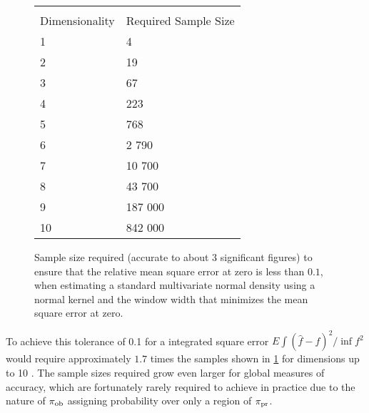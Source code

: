 \begin{figure}
  \begin{tabular}{ l | l }
  \hline \\ Dimensionality & Required Sample Size\\ \hline
  1  & 4\\
  2  & 19\\
  3  & 67\\
  4  & 223\\
  5  & 768\\
  6  & 2 790\\
  7  & 10 700\\
  8  & 43 700\\
  9  & 187 000\\
  10 & 842 000\\ \hline
  \end{tabular}
\caption{Sample size required (accurate to about 3 significant figures) to ensure that the relative mean square error at zero is less than $0.1$, when estimating a standard multivariate normal density using a normal kernel and the window width that minimizes the mean square error at zero.}
\label{table:silverman}
\end{figure}

To achieve this tolerance of 0.1 for a integrated square error $E \int (\hat{f} - f)^2 / \inf f^2$ would require approximately $1.7$ times the samples shown in \ref{table:silverman} for dimensions up to 10 \cite{Silverman}.
The sample sizes required grow even larger for global measures of accuracy, which are fortunately rarely required to achieve in practice due to the nature of $\operatorname*{\pi_{ob}}$ assigning probability over only a region of $\operatorname*{\pi_{pr}}$.

